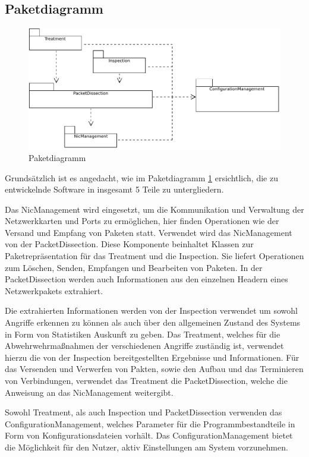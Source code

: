 \documentclass[../review_2.tex]{subfiles}
\begin{document}
\subsection{Paketdiagramm}

\begin{figure}[H]
    \centering
    \includegraphics[width=0.95\linewidth]{img/2-grobentwurf/packet_diagram.pdf}
    \caption{Paketdiagramm}
    \label{fig:dospaketdiagramm}
\end{figure}
Grundsätzlich ist es angedacht, wie im Paketdiagramm \ref{fig:dospaketdiagramm} ersichtlich, die zu entwickelnde Software in insgesamt 5 Teile zu untergliedern.

Das NicManagement wird eingesetzt, um die Kommunikation und Verwaltung der Netzwerkkarten und Ports zu ermöglichen, hier finden Operationen wie der Versand und Empfang von Paketen statt. Verwendet wird das NicManagement von der PacketDissection. Diese Komponente beinhaltet Klassen zur Paketrepräsentation für das Treatment und die Inspection. Sie liefert Operationen zum Löschen, Senden, Empfangen und Bearbeiten von Paketen. In der PacketDissection werden auch Informationen aus den einzelnen Headern eines Netzwerkpakets extrahiert.

Die extrahierten Informationen werden von der Inspection verwendet um sowohl Angriffe erkennen zu können als auch über den allgemeinen Zustand des Systems in Form von Statistiken Auskunft zu geben. Das Treatment, welches für die Abwehrwehrmaßnahmen der verschiedenen Angriffe zuständig ist, verwendet hierzu die von der Inspection bereitgestellten Ergebnisse und Informationen. Für das Versenden und Verwerfen von Pakten, sowie den Aufbau und das Terminieren von Verbindungen, verwendet das Treatment die PacketDissection, welche die Anweisung an das NicManagement weitergibt.

Sowohl Treatment, als auch Inspection und PacketDissection verwenden das ConfigurationManagement, welches Parameter für die Programmbestandteile in Form von Konfigurationsdateien vorhält. Das ConfigurationManagement bietet die Möglichkeit für den Nutzer, aktiv Einstellungen am System vorzunehmen.
\end{document}
